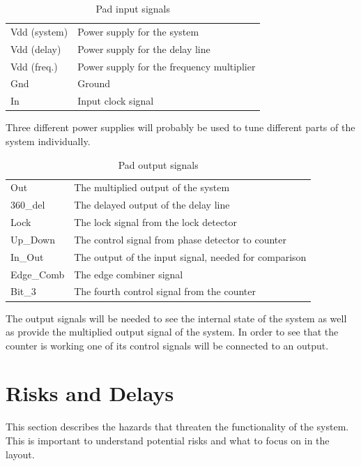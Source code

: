 \documentclass[a4paper,12pt]{article} \usepackage{graphicx}
\begin{document}
\begin{table}[h!]
        \centering
        \begin{tabular}{|l|l|}
                \hline
                Vdd (system) & Power supply for the system \\
                Vdd (delay) & Power supply for the delay line \\
                Vdd (freq.) & Power supply for the frequency multiplier \\
                Gnd & Ground \\
                In & Input clock signal \\
                \hline
        \end{tabular}
        \caption{Pad input signals}
        \label{tab:input_sig}
\end{table}
Three different power supplies will probably be used to tune different parts of
the system individually.
\begin{table}[h!]
        \centering
        \begin{tabular}{|l|l|}
               \hline
               Out & The multiplied output of the system \\
               360\_del & The delayed output of the delay line \\
               Lock & The lock signal from the lock detector \\
               Up\_Down & The control signal from phase detector to counter \\
               In\_Out & The output of the input signal, needed for comparison \\
               Edge\_Comb & The edge combiner signal \\
               Bit\_3 & The fourth control signal from the counter\\
               \hline
        \end{tabular}
        \caption{Pad output signals}
        \label{tab:output_sig}
\end{table}

The output signals will be needed to see the internal state of the system as
well as provide the multiplied output signal of the system. In order to see that
the counter is working one of its control signals will be connected to an
output.

\clearpage
\section{Risks and Delays}
This section describes the hazards that threaten the functionality of the
system. This is important to understand potential risks and what to
focus on in the layout.
\end{document}
